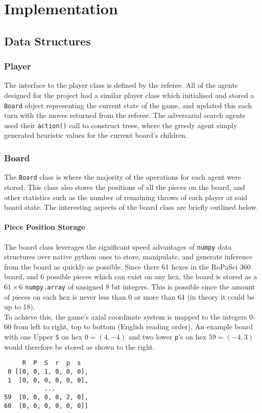 \documentclass{article}
\begin{document}
\section{Implementation}
\subsection{Data Structures}
\label{sec: Data Structures}
\subsubsection{Player}
The interface to the player class is defined by the referee. All of the agents designed for the project had a similar player class which initialised and stored a \verb|Board| object representing the current state of the game, and updated this each turn with the moves returned from the referee. The adversarial search agents used their \verb|action()| call to construct trees, where the greedy agent simply generated heuristic values for the current board's children.

\subsubsection{Board}
The \verb|Board| class is where the majority of the operations for each agent were stored. This class also stores the positions of all the pieces on the board, and other statistics such as the number of remaining throws of each player at said board state. The interesting aspects of the board class are briefly outlined below.\\[4mm]
\begin{minipage}{0.73\textwidth}
\paragraph{Piece Position Storage}
The board class leverages the significant speed advantages of \verb|numpy| data structures over native python ones to store, manipulate, and generate inference from the board as quickly as possible. Since there 61 hexes in the RoPaSci 360 board, and 6 possible pieces which can exist on any hex, the board is stored as a $61 \times 6$ \verb|numpy.array| of unsigned 8 bit integers. This is possible since the amount of pieces on each hex is never less than 0 or more than 64 (in theory it could be up to 18).\\[2mm]
To achieve this, the game's axial coordinate system is mapped to the integers 0-60 from left to right, top to bottom (English reading order). An example board with one Upper \verb|S| on hex $0 = (4, -4)$ and two lower \verb|p|'s on hex $59 = (-4, 3)$ would therefore be stored as shown to the right.
\end{minipage}
\hfill
\begin{minipage}{0.25\textwidth}
\begin{verbatim}
     R  P  S  r  p  s
 0 [[0, 0, 1, 0, 0, 0],
 1  [0, 0, 0, 0, 0, 0],
           ...
59  [0, 0, 0, 0, 2, 0],
60  [0, 0, 0, 0, 0, 0]]
\end{verbatim}
\end{minipage}
\end{document}
